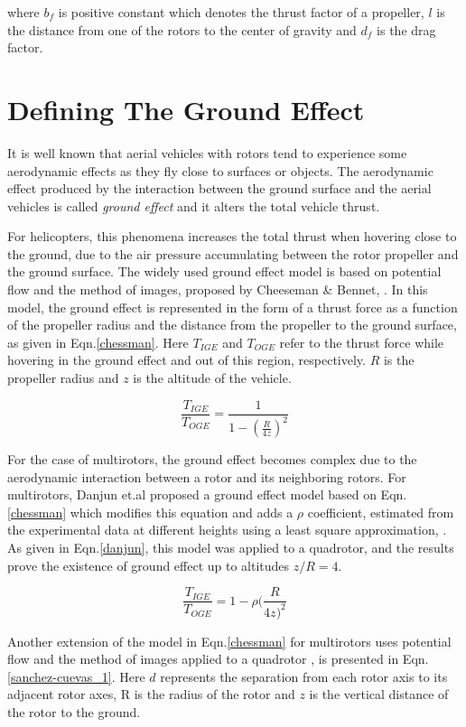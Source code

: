 \documentclass[twocolumn,10pt]{asme2ej}
\begin{document}
where $b_{f}$ is positive constant which denotes the thrust factor of a propeller, $l$ is the distance from one of the rotors to the center of gravity and $d_{f}$ is the drag factor.

\section{Defining The Ground Effect} 
It is well known that aerial vehicles with rotors tend to experience some aerodynamic effects as they fly close to surfaces or objects. The aerodynamic effect produced by the interaction between the ground surface and the aerial vehicles is called \textit{ground effect} and it alters the total vehicle thrust.

For helicopters, this phenomena increases the total thrust when hovering close to the ground, due to the air pressure accumulating between the rotor propeller and the ground surface. The widely used ground effect model is based on potential flow and the method of images, proposed by Cheeseman \& Bennet, \cite{Cheeseman1955}. In this model, the ground effect is represented in the form of a thrust force as a function of the propeller radius and the distance from the propeller to the ground surface, as given in Eqn.\eqref{chessman}. Here $T_{IGE}$ and ${T_{OGE}}$ refer to the thrust force while hovering in the ground effect and out of this region, respectively. $R$ is the propeller radius and $z$ is the altitude of the vehicle.

\begin{equation}
\frac{T_{IGE}}{T_{OGE}} = \frac{1}{1-(\frac{R}{4z})^{2}} \label{chessman}
\end{equation}

For the case of multirotors, the ground effect becomes complex due to the aerodynamic interaction between a rotor and its neighboring rotors. For multirotors, Danjun et.al proposed a ground effect model based on Eqn.\eqref{chessman} which modifies this equation and adds a $\rho$ coefficient, estimated from the experimental data at different heights using a least square approximation, \cite{Danjun2015}. As given in Eqn.\eqref{danjun}, this model was applied to a quadrotor, and the results prove the existence of ground effect up to altitudes $z/R = 4$.

\begin{equation}
\frac{T_{IGE}}{T_{OGE}} = 1-\rho(\frac{R}{4z)^{2}}  \label{danjun}
\end{equation}

Another extension of the model in Eqn.\eqref{chessman} for multirotors uses potential flow and the method of images applied to a quadrotor \cite{Sanchez-Cuevas2017}, is presented in Eqn.\eqref{sanchez-cuevas_1}. Here $d$ represents the separation from each rotor axis to its adjacent rotor axes, R is the radius of the rotor and $z$ is the vertical distance of the rotor to the ground.
\end{document}
